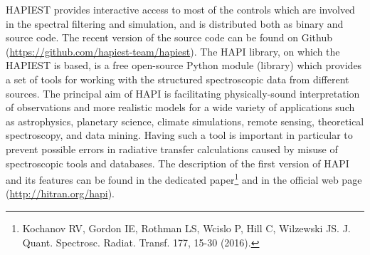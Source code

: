 \documentclass{article}
\begin{document}
HAPIEST provides interactive access to most of the controls which are involved in the spectral filtering and
simulation, and is distributed both as binary and source code. The recent version of the source code can be found on
Github (\href{https://github.com/hapiest-team/hapiest}{https://github.com/hapiest-team/hapiest}). The HAPI library, on
which the HAPIEST is based, is a free open-source Python module (library) which provides a set of tools for working
with the structured spectroscopic data from different sources. The principal aim of HAPI is facilitating
physically-sound interpretation of observations and more realistic models for a wide variety of applications such as
astrophysics, planetary science, climate simulations, remote sensing, theoretical spectroscopy, and data mining. Having
such a tool is important in particular to prevent possible errors in radiative transfer calculations caused by misuse
of spectroscopic tools and databases. The description of the first version of HAPI and its features can be found in the
dedicated paper\footnote{Kochanov RV, Gordon IE, Rothman LS, Wcislo P, Hill C, Wilzewski JS. J. Quant. Spectrosc.
Radiat. Transf. 177, 15-30 (2016).} and in the official web page (\href{http://hitran.org/hapi}{http://hitran.org/hapi}).



   
  
\end{document}

